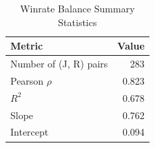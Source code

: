 \begin{table}[htbp]
\centering
\caption{Winrate Balance Summary Statistics}
\label{tab:winrate_balance_summary}
\begin{tabular}{lr}
\toprule
Metric & Value \\
\midrule
Number of (J, R) pairs & 283 \\
Pearson $\rho$ & 0.823 \\
$R^2$ & 0.678 \\
Slope & 0.762 \\
Intercept & 0.094 \\
\bottomrule
\end{tabular}
\end{table}